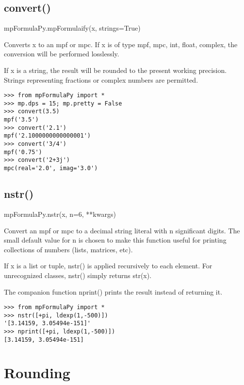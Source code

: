 \subsection{convert()}

mpFormulaPy.mpFormulaify(x, strings=True)

\vpara
Converts x to an mpf or mpc. If x is of type mpf, mpc, int, float, complex, the conversion will be performed losslessly.

\vpara
If x is a string, the result will be rounded to the present working precision. Strings representing fractions or complex numbers are permitted.

\begin{lstlisting}
>>> from mpFormulaPy import *
>>> mp.dps = 15; mp.pretty = False
>>> convert(3.5)
mpf('3.5')
>>> convert('2.1')
mpf('2.1000000000000001')
>>> convert('3/4')
mpf('0.75')
>>> convert('2+3j')
mpc(real='2.0', imag='3.0')
\end{lstlisting}


\subsection{nstr()}

mpFormulaPy.nstr(x, n=6, **kwargs)

\vpara
Convert an mpf or mpc to a decimal string literal with n significant digits. The small default value for n is chosen to make this function useful for printing collections of numbers (lists, matrices, etc).

\vpara
If x is a list or tuple, nstr() is applied recursively to each element. For unrecognized classes, nstr() simply returns str(x).

\vpara
The companion function nprint() prints the result instead of returning it.

\begin{lstlisting}
>>> from mpFormulaPy import *
>>> nstr([+pi, ldexp(1,-500)])
'[3.14159, 3.05494e-151]'
>>> nprint([+pi, ldexp(1,-500)])
[3.14159, 3.05494e-151]
\end{lstlisting}



\newpage
\section{Rounding}
\label{IntegerandRemainderRelatedFunctions}




